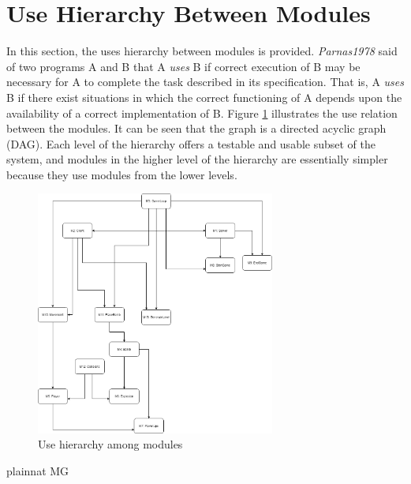 \documentclass[12pt, titlepage]{article}
\begin{document}
\section{Use Hierarchy Between Modules} \label{SecUse}

In this section, the uses hierarchy between modules is
provided. \textit{Parnas1978} said of two programs A and B that A {\em uses} B if
correct execution of B may be necessary for A to complete the task described in
its specification. That is, A {\em uses} B if there exist situations in which
the correct functioning of A depends upon the availability of a correct
implementation of B.  Figure \ref{FigUH} illustrates the use relation between
the modules. It can be seen that the graph is a directed acyclic graph
(DAG). Each level of the hierarchy offers a testable and usable subset of the
system, and modules in the higher level of the hierarchy are essentially simpler
because they use modules from the lower levels.

\begin{figure}[H]
\centering
\includegraphics[width=0.7\textwidth]{UsesHierarchy.png}
\caption{Use hierarchy among modules}
\label{FigUH}
\end{figure}


 {plainnat}
 {MG}
\end{document}
